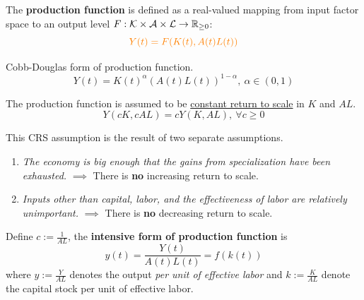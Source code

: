 \documentclass[11pt]{article}
\begin{document}
            \begin{definition}
                The \textbf{production function} is defined as a real-valued mapping from input factor space to an output level $F: \mathcal{{K}} \times \mathcal{{A}} \times \mathcal{{L}} \to \mathbb{R}_{\geq 0}$:
	            \begin{equation}
                    \textcolor{orange}{Y(t) = F(K(t), A(t)L(t))}
	            \end{equation}
            \end{definition}
            
            \begin{example}
            	    Cobb-Douglas form of production function.
                \begin{equation}
                    Y(t) = K(t)^\alpha (A(t)L(t))^{1 - \alpha},\ \alpha \in (0, 1)
                \end{equation}
            \end{example}
            
            \begin{assumption} The production function is assumed to be \ul{constant return to scale} in $K$ and $AL$.
	            \begin{equation}
	            		Y(cK, cAL) = cY(K, AL),\ \forall c \geq 0
	            \end{equation}
	            
           	This CRS assumption is the result of two separate assumptions.
           	\begin{enumerate}
           		\item \emph{The economy is big enough that the gains from specialization have been exhausted.} $\implies$ There is \textbf{no} increasing return to scale.
           		\item \emph{Inputs other than capital, labor, and the effectiveness of labor are relatively unimportant.} $\implies$ There is \textbf{no} decreasing return to scale.
           	\end{enumerate}
            \end{assumption}
            
            \begin{definition}
                Define $c := \frac{1}{AL}$, the \textbf{intensive form of production function} is
                \begin{equation}
                    y(t) = \frac{Y(t)}{A(t)L(t)} = f(k(t))
                \end{equation}
                where $y := \frac{Y}{AL}$ denotes the output \emph{per unit of effective labor} and $k := \frac{K}{AL}$ denote the capital stock per unit of effective labor.
            \end{definition}
	
\end{document}
